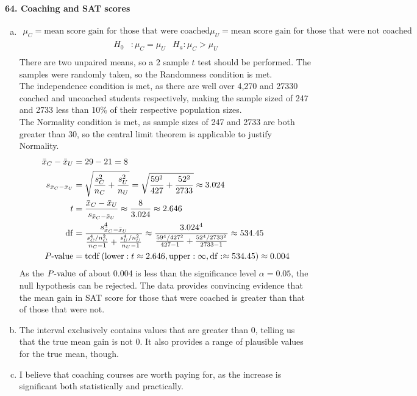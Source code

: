 \documentclass[../Homework]{subfiles}
\begin{document}
		\paragraph{64. Coaching and SAT scores}
			\begin{enumerate}[a.]
				\item
					\begin{align*}
						\mu_C = \text{mean score gain for those that were coached}
						\mu_U = \text{mean score gain for those that were not coached}
					\end{align*}
					\begin{align*}
						H_0&: \mu_C = \mu_U & H_a: \mu_C > \mu_U \\
					\end{align*}
					There are two unpaired means, so a 2 sample $t$ test should be performed.
					The samples were randomly taken, so the Randomness condition is met. \\
					The independence condition is met, as there are well over 4,270 and 27330 coached and uncoached students respectively, making the sample sized of 247 and 2733 less than 10\% of their respective population sizes. \\
					The Normality condition is met, as sample sizes of 247 and 2733 are both greater than 30, so the central limit theorem is applicable to justify Normality.
					\begin{align*}
						\bar{x}_C - \bar{x}_U &= 29 - 21 = 8 \\
						s_{\bar{x}_C - \bar{x}_U} &= \sqrt{\frac{s_C^2}{n_C} + \frac{s_U^2}{n_U}} = \sqrt{\frac{59^2}{427} + \frac{52^2}{2733}} \approx 3.024 \\
						t &= \frac{\bar{x}_C - \bar{x}_U}{s_{\bar{x}_C - \bar{x}_U}} \approx \frac{8}{3.024} \approx 2.646 \\
						\operatorname{df} &= \frac{s_{\bar{x}_C - \bar{x}_U}^4}{\frac{s_C^4/n_C^2}{n_C - 1} + \frac{s_U^4/n_U^2}{n_U - 1}} \approx \frac{3.024^4}{\frac{59^4/427^2}{427 - 1} + \frac{52^4/2733^2}{2733 - 1}} \approx 534.45 \\
						P\text{-value} &= \operatorname{tcdf}\left(\operatorname{lower}: t \approx 2.646, \operatorname{upper}: \infty, \operatorname{df}: \approx 534.45\right) \approx 0.004 
					\end{align*}
					As the $P\text{-value}$ of about 0.004 is less than the significance level $\alpha = 0.05$, the null hypothesis can be rejected. The data provides convincing evidence that the mean gain in SAT score for those that were coached is greater than that of those that were not.
				\item
					The interval exclusively contains values that are greater than 0, telling us that the true mean gain is not 0. It also provides a range of plausible values for the true mean, though.
				\item
					I believe that coaching courses are worth paying for, as the increase is significant both statistically and practically.
			\end{enumerate}
\end{document}
